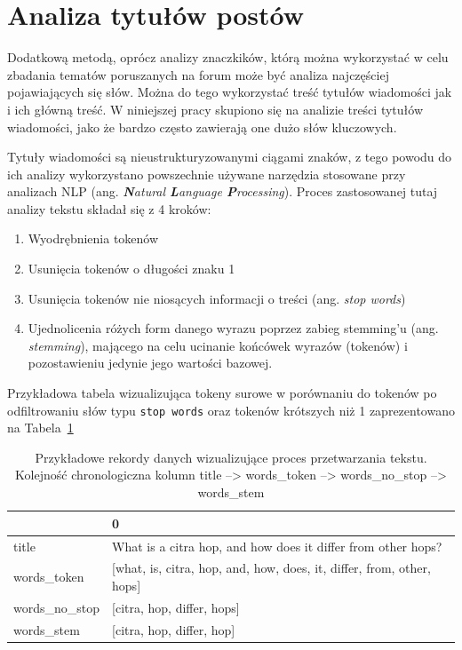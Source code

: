 \documentclass[
  letterpaper,
  DIV=11,
  numbers=noendperiod]{scrreprt}
\providecommand{\tightlist}{%
  \setlength{\itemsep}{0pt}\setlength{\parskip}{0pt}}\usepackage{longtable,booktabs,array}
\begin{document}
\hypertarget{analiza-tytuux142uxf3w-postuxf3w}{%
\section{Analiza tytułów
postów}\label{analiza-tytuux142uxf3w-postuxf3w}}

Dodatkową metodą, oprócz analizy znaczkików, którą można wykorzystać w
celu zbadania tematów poruszanych na forum może być analiza najczęściej
pojawiających się słów. Można do tego wykorzystać treść tytułów
wiadomości jak i ich główną treść. W niniejszej pracy skupiono się na
analizie treści tytułów wiadomości, jako że bardzo często zawierają one
dużo słów kluczowych.

Tytuły wiadomości są nieustrukturyzowanymi ciągami znaków, z tego powodu
do ich analizy wykorzystano powszechnie używane narzędzia stosowane przy
analizach NLP (ang. \emph{\textbf{N}atural \textbf{L}anguage
\textbf{P}rocessing}). Proces zastosowanej tutaj analizy tekstu składał
się z 4 kroków:

\begin{enumerate}
\def\labelenumi{\arabic{enumi}.}
\tightlist
\item
  Wyodrębnienia tokenów
\item
  Usunięcia tokenów o długości znaku 1
\item
  Usunięcia tokenów nie niosących informacji o treści (ang. \emph{stop
  words})
\item
  Ujednolicenia różych form danego wyrazu poprzez zabieg stemming'u
  (ang. \emph{stemming}), mającego na celu ucinanie końcówek wyrazów
  (tokenów) i pozostawieniu jedynie jego wartości bazowej.
\end{enumerate}

Przykładowa tabela wizualizująca tokeny surowe w porównaniu do tokenów
po odfiltrowaniu słów typu \texttt{stop\ words} oraz tokenów krótszych
niż 1 zaprezentowano na Tabela~\ref{tbl-tokens}

\hypertarget{tbl-tokens}{}
\begin{table}
\caption{\label{tbl-tokens}Przykładowe rekordy danych wizualizujące proces przetwarzania tekstu.
Kolejność chronologiczna kolumn title --\textgreater{} words\_token
--\textgreater{} words\_no\_stop --\textgreater{} words\_stem }\tabularnewline

\centering
\begin{tabular}{ll}
\toprule
{} &                                                                      0 \\
\midrule
title         &           What is a citra hop, and how does it differ from other hops? \\
words\_token   &  [what, is, citra, hop, and, how, does, it, differ, from, other, hops] \\
words\_no\_stop &                                             [citra, hop, differ, hops] \\
words\_stem    &                                              [citra, hop, differ, hop] \\
\bottomrule
\end{tabular}
\end{table}
\end{document}
